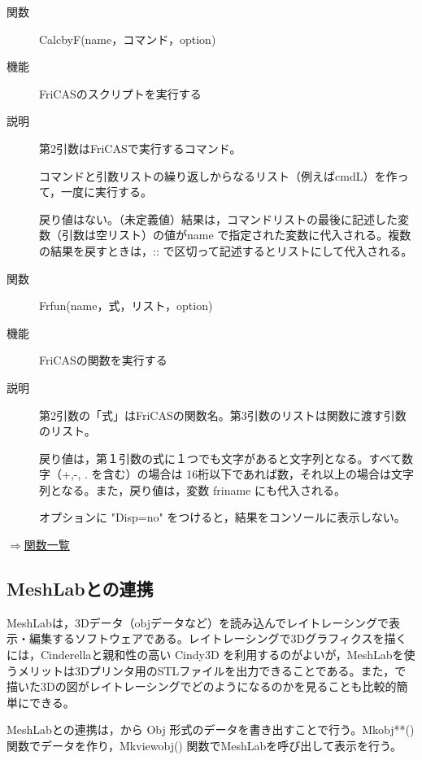 \documentclass[papersize,a4paper,12pt,uplatex]{jsarticle}
\begin{document}
\begin{description}

\hypertarget{calcbyF}{}
\item[関数]CalcbyF(name，コマンド，option)
\item[機能]FriCASのスクリプトを実行する
\item[説明]第2引数はFriCASで実行するコマンド。

コマンドと引数リストの繰り返しからなるリスト（例えばcmdL）を作って，一度に実行する。

戻り値はない。（未定義値）結果は，コマンドリストの最後に記述した変数（引数は空リスト）の値がname で指定された変数に代入される。複数の結果を戻すときは，:: で区切って記述するとリストにして代入される。


\vspace{\baselineskip}
\hypertarget{frfun}{}
\item[関数]Frfun(name，式，リスト，option)
\item[機能]FriCASの関数を実行する
\item[説明]第2引数の「式」はFriCASの関数名。第3引数のリストは関数に渡す引数のリスト。

戻り値は，第１引数の式に１つでも文字があると文字列となる。すべて数字（+,-, . を含む）の場合は
16桁以下であれば数，それ以上の場合は文字列となる。また，戻り値は，変数 friname にも代入される。

オプションに "Disp=no" をつけると，結果をコンソールに表示しない。


\end{description}
\begin{flushright}\hyperlink{functionlist}{$\Rightarrow$関数一覧}\end{flushright}


\subsection{MeshLabとの連携}

MeshLabは，3Dデータ（objデータなど）を読み込んでレイトレーシングで表示・編集するソフトウェアである。レイトレーシングで3Dグラフィクスを描くには，Cinderellaと親和性の高い Cindy3D を利用するのがよいが，MeshLabを使うメリットは3Dプリンタ用のSTLファイルを出力できることである。また，\ketcindy で描いた3Dの図がレイトレーシングでどのようになるのかを見ることも比較的簡単にできる。

MeshLabとの連携は，\ketcindy から Obj 形式のデータを書き出すことで行う。Mkobj**() 関数でデータを作り，Mkviewobj() 関数でMeshLabを呼び出して表示を行う。
\end{document}
